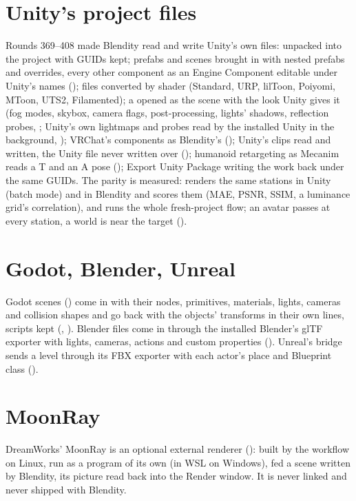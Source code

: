 \section{Unity's project files}
Rounds 369--408 made Blendity read and write Unity's own files:  unpacked into the project with
GUIDs kept; prefabs and scenes brought in with nested prefabs and overrides, every other component as an Engine
Component editable under Unity's names ();  files converted by shader (Standard, URP, lilToon,
Poiyomi, MToon, UTS2, Filamented); a  opened as the scene with the look Unity gives it (fog modes, skybox,
camera flags, post-processing, lights' shadows, reflection probes, ; Unity's own lightmaps and probes read
by the installed Unity in the background, ); VRChat's components as Blendity's (); Unity's
 clips read and written, the Unity file never written over (); humanoid retargeting as Mecanim
reads a T and an A pose (); Export Unity Package writing the work back under the same GUIDs. The parity is
measured:  renders the same stations in Unity (batch mode) and in Blendity and scores them
(MAE, PSNR, SSIM, a luminance grid's correlation), and  runs the whole fresh-project flow;
an avatar passes at every station, a world is near the target ().

\section{Godot, Blender, Unreal}
Godot scenes () come in with their nodes, primitives, materials, lights, cameras and collision shapes and go
back with the objects' transforms in their own lines, scripts kept (, \cite{GodotDocs2026}). Blender files come
in through the installed Blender's glTF exporter with lights, cameras, actions and custom properties (). Unreal's
bridge sends a level through its FBX exporter with each actor's place and Blueprint class (\cite{UnrealDocs2026}).

\section{MoonRay}
DreamWorks' MoonRay \cite{MoonRay2026} is an optional external renderer (): built by the 
workflow on Linux, run as a program of its own (in WSL on Windows), fed a scene written by Blendity, its picture read
back into the Render window. It is never linked and never shipped with Blendity.

